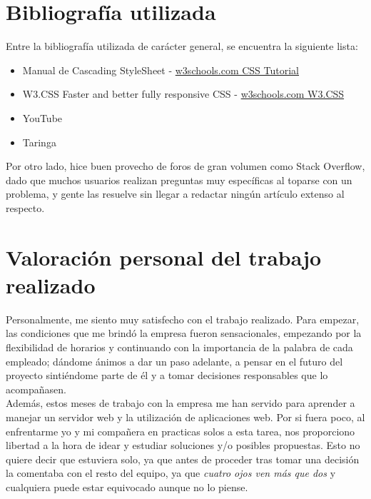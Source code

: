 		\newpage
		
	\part{Bibliografía utilizada}
		Entre la bibliografía utilizada de carácter general, se encuentra la siguiente lista:
		
		\begin{itemize}
			\item Manual de Cascading StyleSheet - \href{https://www.w3schools.com/css/default.asp}{w3schools.com CSS Tutorial}
			\item W3.CSS Faster and better fully responsive CSS - \href{https://www.w3schools.com/w3css/default.asp}{w3schools.com W3.CSS}
			\item YouTube
			\item Taringa
			
		\end{itemize}
		
		Por otro lado, hice buen provecho de foros de gran volumen como Stack Overflow, dado que muchos usuarios realizan preguntas muy específicas al toparse con un problema, y gente las resuelve sin llegar a redactar ningún artículo extenso al respecto.
		
		\newpage
		
	\part{Valoración personal del trabajo realizado}
	
		Personalmente, me siento muy satisfecho con el trabajo realizado. Para empezar, las condiciones que me brindó la empresa fueron sensacionales, empezando por la flexibilidad de horarios y continuando con la importancia de la palabra de cada empleado; dándome ánimos a dar un paso adelante, a pensar en el futuro del proyecto sintiéndome parte de él y a tomar decisiones responsables que lo acompañasen.\\
		
		Además, estos meses de trabajo con la empresa me han servido para aprender a manejar un servidor web y la utilización de aplicaciones web. Por si fuera poco, al enfrentarme yo y mi compañera en practicas solos a esta tarea, nos proporciono libertad a la hora de idear y estudiar soluciones y/o posibles propuestas. Esto no quiere decir que estuviera solo, ya que antes de proceder tras tomar una decisión la comentaba con el resto del equipo, ya que \textit{cuatro ojos ven más que dos} y cualquiera puede estar equivocado aunque no lo piense.\\
		
